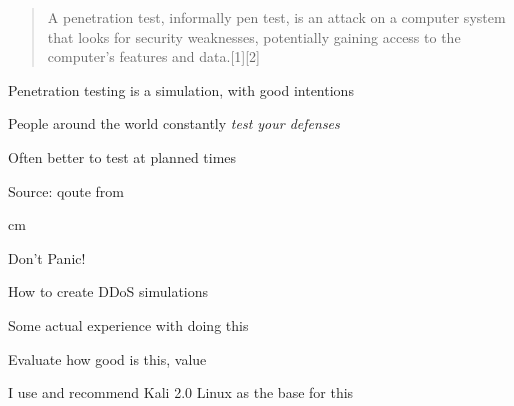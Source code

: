 \documentclass[20pt,landscape,a4paper,footrule]{foils}
\begin{document}


\hlkprofiluk


\begin{quote}
A penetration test, informally pen test, is an attack on a computer system that looks for security weaknesses, potentially gaining access to the computer's features and data.[1][2]
\end{quote}

\begin{list1}
\item Penetration testing is a simulation, with good intentions
\item People around the world constantly \emph{test your defenses}
\item Often better to test at planned times
\end{list1}

Source: qoute from 



 cm

\centerline{\color{titlecolor}\LARGE Don't Panic!}

\begin{list1}
\item How to create DDoS simulations
\item Some actual experience with doing this
\item Evaluate how good is this, value
\end{list1}

\vskip 1cm
\centerline{I use and recommend Kali 2.0 Linux as the base for this}





\end{document}
